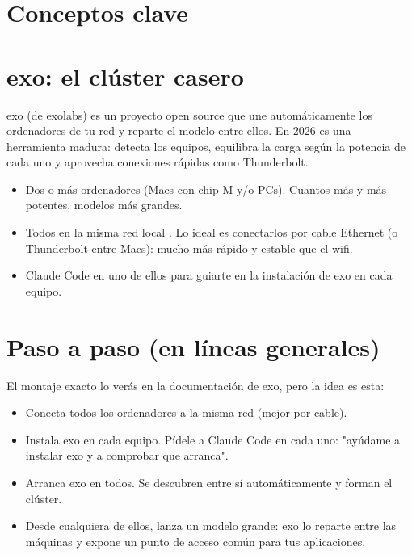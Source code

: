 \documentclass[11pt,a4paper]{book}
\begin{document}
\section{Conceptos clave}
\section{exo: el clúster casero}
exo (de exolabs) es un proyecto open source que une automáticamente los ordenadores de tu red y reparte el modelo entre ellos. En 2026 es una herramienta madura: detecta los equipos, equilibra la carga según la potencia de cada uno y aprovecha conexiones rápidas como Thunderbolt.

\begin{itemize}\item Dos o más ordenadores (Macs con chip M y/o PCs). Cuantos más y más potentes, modelos más grandes.\end{itemize}
\begin{itemize}\item Todos en la misma red local . Lo ideal es conectarlos por cable Ethernet (o Thunderbolt entre Macs): mucho más rápido y estable que el wifi.\end{itemize}
\begin{itemize}\item Claude Code en uno de ellos para guiarte en la instalación de exo en cada equipo.\end{itemize}
\section{Paso a paso (en líneas generales)}
El montaje exacto lo verás en la documentación de exo, pero la idea es esta:

\begin{itemize}\item Conecta todos los ordenadores a la misma red (mejor por cable).\end{itemize}
\begin{itemize}\item Instala exo en cada equipo. Pídele a Claude Code en cada uno: "ayúdame a instalar exo y a comprobar que arranca".\end{itemize}
\begin{itemize}\item Arranca exo en todos. Se descubren entre sí automáticamente y forman el clúster.\end{itemize}
\begin{itemize}\item Desde cualquiera de ellos, lanza un modelo grande: exo lo reparte entre las máquinas y expone un punto de acceso común para tus aplicaciones.\end{itemize}
\end{document}
